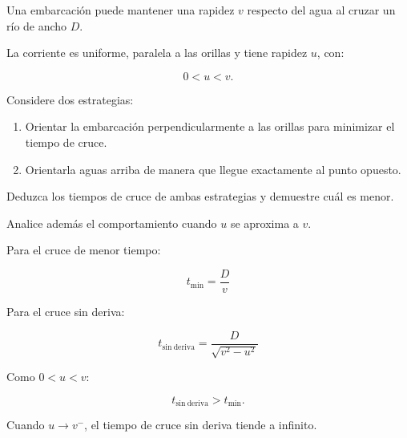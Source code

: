 \begin{ejercicio}
Una embarcación puede mantener una rapidez
\(v\) respecto del agua al cruzar un río
de ancho \(D\).

La corriente es uniforme, paralela a las
orillas y tiene rapidez \(u\), con:

\[
0<u<v.
\]

Considere dos estrategias:

\begin{enumerate}[label=\alph*)]
    \item Orientar la embarcación perpendicularmente
    a las orillas para minimizar el tiempo de cruce.
    \item Orientarla aguas arriba de manera
    que llegue exactamente al punto opuesto.
\end{enumerate}

Deduzca los tiempos de cruce de ambas estrategias
y demuestre cuál es menor.

Analice además el comportamiento cuando
\(u\) se aproxima a \(v\).
\end{ejercicio}

\begin{respuesta}
Para el cruce de menor tiempo:

\[
\boxed{
t_{\min}=\frac{D}{v}
}
\]

Para el cruce sin deriva:

\[
\boxed{
t_{\mathrm{sin\ deriva}}
=
\frac{D}{\sqrt{v^2-u^2}}
}
\]

Como \(0<u<v\):

\[
\boxed{
t_{\mathrm{sin\ deriva}}>t_{\min}
}.
\]

Cuando \(u\to v^{-}\), el tiempo
de cruce sin deriva tiende a infinito.
\end{respuesta}

